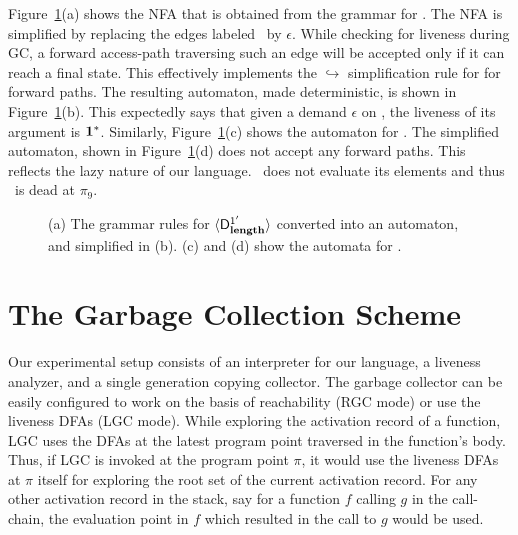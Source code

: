 \documentclass[9pt]{sigplanconf}
\newcommand{\cred}[1]{{\color{red}{#1}}}
\begin{document}
Figure~\ref{fig:example-automata}(a)  shows the  NFA that  is obtained
from the  grammar for  .  The  NFA is
simplified by replacing the edges labeled \clazy\ by $\epsilon$. While
checking for liveness during GC, a forward access-path traversing such
an edge  will be accepted  only if it  can reach a final  state.  This
effectively implements  the $\hookrightarrow$ simplification  rule for
\clazy for forward paths. The resulting automaton, made deterministic,
is shown in Figure~\ref{fig:example-automata}(b). This expectedly says
that  given  a demand  $\epsilon$  on  \length,  the liveness  of  its
argument             is             $\mathbf{1}^{*}$.            Similarly,
Figure~\ref{fig:example-automata}(c)    shows   the    automaton   for
. The simplified automaton, shown in
Figure~\ref{fig:example-automata}(d) does not accept any forward
paths. This reflects the lazy nature of our language. \length\  does not
evaluate its elements and thus \pa\ is dead at $\pi_9$.

\begin{figure}[t!]
\caption{(a) The grammar rules for $\langle \mathsf{D}_{\mathit {\mathbf{length}}}^{1'}\rangle$
converted into
  an automaton, and simplified in   (b). (c) and (d) show the automata
  for   .}\label{fig:example-automata}
\figrule
\end{figure}


\section{The Garbage Collection Scheme}
\cred{Introduction}

Our experimental setup consists of  an interpreter for our language, a
liveness  analyzer, and  a single  generation copying  collector.  The
garbage collector  can be  easily configured to  work on the  basis of
reachability (RGC  mode) or use  the liveness DFAs (LGC  mode).  While
exploring the  activation record of a  function, LGC uses  the DFAs at
the latest program  point traversed in the function's  body.  Thus, if
LGC is invoked  at the program point $\pi$, it  would use the liveness
DFAs  at  $\pi$ itself  for  exploring the  root  set  of the  current
activation record. For  any other activation record in  the stack, say
for a function ${\mathit f}$  calling ${\mathit g}$ in the call-chain,
the evaluation  point in ${\mathit f}$  which resulted in  the call to
${\mathit g}$ would be used.
\end{document}
